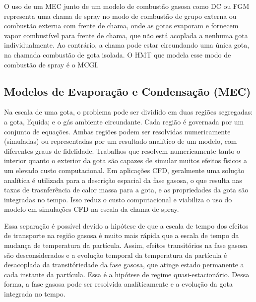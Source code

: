 O uso de um MEC junto de um modelo de combustão gasosa como DC ou FGM representa uma chama de spray no modo de combustão de grupo externa ou combustão externa com frente de chama, onde as gotas evaporam e fornecem vapor combustível para frente de chama, que não está acoplada a nenhuma gota individualmente.
Ao contrário, a chama pode estar circundando uma única gota, na chamada combustão de gota isolada.
O HMT que modela esse modo de combustão de spray é o MCGI.


\subsection{Modelos de Evaporação e Condensação (MEC)} \label{sec:MEC}


Na escala de uma gota, o problema pode ser dividido em duas regiões segregadas: a gota, líquida; e o gás ambiente circundante. 
Cada região é governada por um conjunto de equações.
Ambas regiões podem ser resolvidas numericamente (simuladas) ou representadas por um resultado analítico de um modelo, com diferentes graus de fidelidade.
Trabalhos que resolvem numericamente tanto o interior quanto o exterior da gota são capazes de simular muitos efeitos físicos a um elevado custo computacional. %
Em aplicações CFD, geralmente uma solução analítica é utilizada para a descrição espacial da fase gasosa, o que resulta nas taxas de trasnferência de calor massa para a gota, e as propriedades da gota são integradas no tempo.
Isso reduz o custo computacional e viabiliza o uso do modelo em simulações CFD na escala da chama de spray.

Essa separação é possível devido a hipótese de que a escala de tempo dos efeitos de transporte na região gasosa é muito mais rápida que a escala de tempo da mudança de temperatura da partícula.
Assim, efeitos transitórios na fase gasosa são desconsiderados e a evolução temporal da temperatura da partícula é desacoplada da transitóriedade da fase gasosa, que atinge estado permanente a cada instante da partícula.
Essa é a hipótese de regime quasi-estacionário.
Dessa forma, a fase gasosa pode ser resolvida analíticamente e a evolução da gota integrada no tempo.

